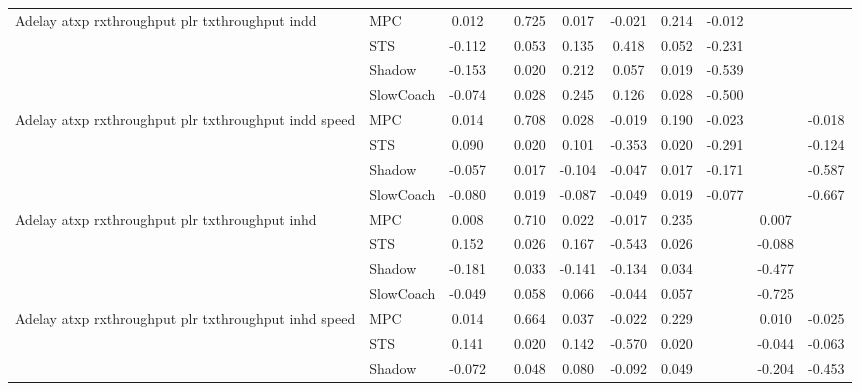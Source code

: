 \begin{tabular}{|l|l|*{9}{c|}}
\midrule
Adelay atxp rxthroughput plr txthroughput indd    & MPC &    0.012 &        &     0.725 &  0.017 & -0.021 &  0.214 &  -0.012 &      &       \\
                              & STS &   -0.112 &        &     0.053 &  0.135 &  0.418 &  0.052 &  -0.231 &      &       \\
                              & Shadow &   -0.153 &        &     0.020 &  0.212 &  0.057 &  0.019 &  -0.539 &      &       \\
                              & SlowCoach &   -0.074 &        &     0.028 &  0.245 &  0.126 &  0.028 &  -0.500 &      &       \\
\midrule
Adelay atxp rxthroughput plr txthroughput indd speed    & MPC &    0.014 &        &     0.708 &  0.028 & -0.019 &  0.190 &  -0.023 &      &   -0.018 \\
                              & STS &    0.090 &        &     0.020 &  0.101 & -0.353 &  0.020 &  -0.291 &      &   -0.124 \\
                              & Shadow &   -0.057 &        &     0.017 & -0.104 & -0.047 &  0.017 &  -0.171 &      &   -0.587 \\
                              & SlowCoach &   -0.080 &        &     0.019 & -0.087 & -0.049 &  0.019 &  -0.077 &      &   -0.667 \\
\midrule
Adelay atxp rxthroughput plr txthroughput inhd    & MPC &    0.008 &        &     0.710 &  0.022 & -0.017 &  0.235 &      &   0.007 &       \\
                              & STS &    0.152 &        &     0.026 &  0.167 & -0.543 &  0.026 &      &  -0.088 &       \\
                              & Shadow &   -0.181 &        &     0.033 & -0.141 & -0.134 &  0.034 &      &  -0.477 &       \\
                              & SlowCoach &   -0.049 &        &     0.058 &  0.066 & -0.044 &  0.057 &      &  -0.725 &       \\
\midrule
Adelay atxp rxthroughput plr txthroughput inhd speed    & MPC &    0.014 &        &     0.664 &  0.037 & -0.022 &  0.229 &      &   0.010 &   -0.025 \\
                              & STS &    0.141 &        &     0.020 &  0.142 & -0.570 &  0.020 &      &  -0.044 &   -0.063 \\
                              & Shadow &   -0.072 &        &     0.048 &  0.080 & -0.092 &  0.049 &      &  -0.204 &   -0.453 \\

\end{tabular}
